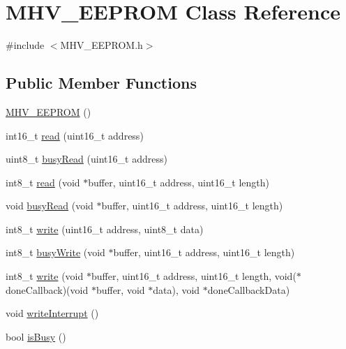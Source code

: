 \hypertarget{class_m_h_v___e_e_p_r_o_m}{\section{M\-H\-V\-\_\-\-E\-E\-P\-R\-O\-M Class Reference}
\label{class_m_h_v___e_e_p_r_o_m}
}


{\ttfamily \#include $<$M\-H\-V\-\_\-\-E\-E\-P\-R\-O\-M.\-h$>$}

\subsection*{Public Member Functions}
\begin{DoxyCompactItemize}
\item 
\hyperlink{class_m_h_v___e_e_p_r_o_m_acaeffffc48a4a81e5e600fc110759cae}{M\-H\-V\-\_\-\-E\-E\-P\-R\-O\-M} ()
\item 
int16\-\_\-t \hyperlink{class_m_h_v___e_e_p_r_o_m_a24c6913bd28975120511526f32421ed0}{read} (uint16\-\_\-t address)
\item 
uint8\-\_\-t \hyperlink{class_m_h_v___e_e_p_r_o_m_a87d05081ca4652b2c36b76ee366eeda2}{busy\-Read} (uint16\-\_\-t address)
\item 
int8\-\_\-t \hyperlink{class_m_h_v___e_e_p_r_o_m_a5399a22382e3211edcc6466a4677a28a}{read} (void $\ast$buffer, uint16\-\_\-t address, uint16\-\_\-t length)
\item 
void \hyperlink{class_m_h_v___e_e_p_r_o_m_a76f3d0b2b2b050395c5af6daa664fd52}{busy\-Read} (void $\ast$buffer, uint16\-\_\-t address, uint16\-\_\-t length)
\item 
int8\-\_\-t \hyperlink{class_m_h_v___e_e_p_r_o_m_a8c0534fe37b0ef07b02b2cd794cc7dc0}{write} (uint16\-\_\-t address, uint8\-\_\-t data)
\item 
int8\-\_\-t \hyperlink{class_m_h_v___e_e_p_r_o_m_a4e17c3d62c5f6c4759e32f2217c68c21}{busy\-Write} (void $\ast$buffer, uint16\-\_\-t address, uint16\-\_\-t length)
\item 
int8\-\_\-t \hyperlink{class_m_h_v___e_e_p_r_o_m_a64746e9c76c7f8d20fa4d7e09d183a0d}{write} (void $\ast$buffer, uint16\-\_\-t address, uint16\-\_\-t length, void($\ast$done\-Callback)(void $\ast$buffer, void $\ast$data), void $\ast$done\-Callback\-Data)
\item 
void \hyperlink{class_m_h_v___e_e_p_r_o_m_a9772d021dd90d557318244f3353c1ba9}{write\-Interrupt} ()
\item 
bool \hyperlink{class_m_h_v___e_e_p_r_o_m_ae22d6ae1d73cd1bc21720ca6617374af}{is\-Busy} ()
\end{DoxyCompactItemize}


